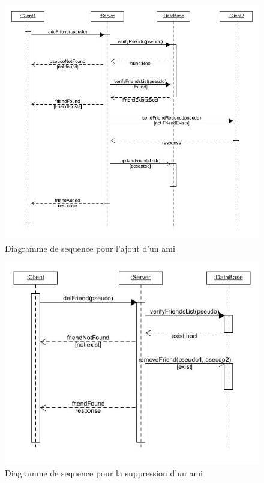\documentclass[a4paper,12pt]{article}
\begin{document}
\newpage
\begin{figure}[hbtp]
\centering
\includegraphics[scale=0.5]{add_friend}
\caption{Diagramme de sequence pour l'ajout d'un ami }
\end{figure}

\begin{figure}[hbtp]
\centering
\includegraphics[scale=0.5]{del_friend}
\caption{Diagramme de sequence pour la suppression d'un ami }
\end{figure}
\end{document}
